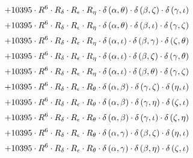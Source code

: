 \begin{subequations}
\begin{gather}
 \\[0.2em] \notag 		 + 10395 \cdot R^{6} \cdot R_{\delta{}} \cdot R_{\epsilon{}} \cdot R_{\eta{}} \cdot \delta{}\left(\alpha{}, \theta{}\right) \cdot \delta{}\left(\beta{}, \zeta{}\right) \cdot \delta{}\left(\gamma{}, \iota{}\right) 
 \\[0.2em] \notag 		 + 10395 \cdot R^{6} \cdot R_{\delta{}} \cdot R_{\epsilon{}} \cdot R_{\eta{}} \cdot \delta{}\left(\alpha{}, \theta{}\right) \cdot \delta{}\left(\beta{}, \iota{}\right) \cdot \delta{}\left(\gamma{}, \zeta{}\right) 
 \\[0.2em] \notag 		 + 10395 \cdot R^{6} \cdot R_{\delta{}} \cdot R_{\epsilon{}} \cdot R_{\eta{}} \cdot \delta{}\left(\alpha{}, \iota{}\right) \cdot \delta{}\left(\beta{}, \gamma{}\right) \cdot \delta{}\left(\zeta{}, \theta{}\right) 
 \\[0.2em] \notag 		 + 10395 \cdot R^{6} \cdot R_{\delta{}} \cdot R_{\epsilon{}} \cdot R_{\eta{}} \cdot \delta{}\left(\alpha{}, \iota{}\right) \cdot \delta{}\left(\beta{}, \zeta{}\right) \cdot \delta{}\left(\gamma{}, \theta{}\right) 
 \\[0.2em] \notag 		 + 10395 \cdot R^{6} \cdot R_{\delta{}} \cdot R_{\epsilon{}} \cdot R_{\eta{}} \cdot \delta{}\left(\alpha{}, \iota{}\right) \cdot \delta{}\left(\beta{}, \theta{}\right) \cdot \delta{}\left(\gamma{}, \zeta{}\right) 
 \\[0.2em] \notag 		 + 10395 \cdot R^{6} \cdot R_{\delta{}} \cdot R_{\epsilon{}} \cdot R_{\theta{}} \cdot \delta{}\left(\alpha{}, \beta{}\right) \cdot \delta{}\left(\gamma{}, \zeta{}\right) \cdot \delta{}\left(\eta{}, \iota{}\right) 
 \\[0.2em] \notag 		 + 10395 \cdot R^{6} \cdot R_{\delta{}} \cdot R_{\epsilon{}} \cdot R_{\theta{}} \cdot \delta{}\left(\alpha{}, \beta{}\right) \cdot \delta{}\left(\gamma{}, \eta{}\right) \cdot \delta{}\left(\zeta{}, \iota{}\right) 
 \\[0.2em] \notag 		 + 10395 \cdot R^{6} \cdot R_{\delta{}} \cdot R_{\epsilon{}} \cdot R_{\theta{}} \cdot \delta{}\left(\alpha{}, \beta{}\right) \cdot \delta{}\left(\gamma{}, \iota{}\right) \cdot \delta{}\left(\zeta{}, \eta{}\right) 
 \\[0.2em] \notag 		 + 10395 \cdot R^{6} \cdot R_{\delta{}} \cdot R_{\epsilon{}} \cdot R_{\theta{}} \cdot \delta{}\left(\alpha{}, \gamma{}\right) \cdot \delta{}\left(\beta{}, \zeta{}\right) \cdot \delta{}\left(\eta{}, \iota{}\right) 
 \\[0.2em] \notag 		 + 10395 \cdot R^{6} \cdot R_{\delta{}} \cdot R_{\epsilon{}} \cdot R_{\theta{}} \cdot \delta{}\left(\alpha{}, \gamma{}\right) \cdot \delta{}\left(\beta{}, \eta{}\right) \cdot \delta{}\left(\zeta{}, \iota{}\right) 

\end{gather}
\end{subequations}
